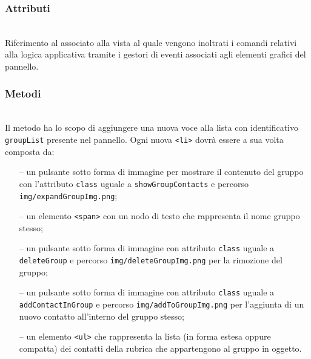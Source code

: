 \subsubsection*{Attributi}
\begin{description}
  \item{}\\
  Riferimento al  associato alla vista al quale vengono inoltrati i comandi relativi alla logica applicativa tramite i gestori di eventi associati agli elementi grafici del pannello.
\end{description}

\subsubsection*{Metodi}
\begin{description}
  
  \item{}\\
  Il metodo ha lo scopo di aggiungere una nuova voce alla lista con identificativo \verb'groupList' presente nel pannello. Ogni nuova \verb'<li>' dovrà essere a sua volta composta da:
  \begin{itemize}
    \item[--] un pulsante sotto forma di immagine per mostrare il contenuto del gruppo con l'attributo \texttt{class} uguale a \texttt{showGroupContacts} e percorso \texttt{img/expandGroupImg.png};
    \item[--] un elemento \verb'<span>' con un nodo di testo  che rappresenta il nome gruppo stesso;
    \item[--] un pulsante sotto forma di immagine con attributo \texttt{class} uguale a \texttt{deleteGroup} e percorso \texttt{img/deleteGroupImg.png} per la rimozione del gruppo;
    \item[--] un pulsante sotto forma di immagine con attributo \texttt{class} uguale a \texttt{addContactInGroup} e percorso \texttt{img/addToGroupImg.png} per l'aggiunta di un nuovo contatto all'interno del gruppo stesso;
    \item[--] un elemento \verb'<ul>' che rappresenta la lista (in forma estesa oppure compatta) dei contatti della rubrica che appartengono al gruppo in oggetto.
  \end{itemize}
  

\end{description}
